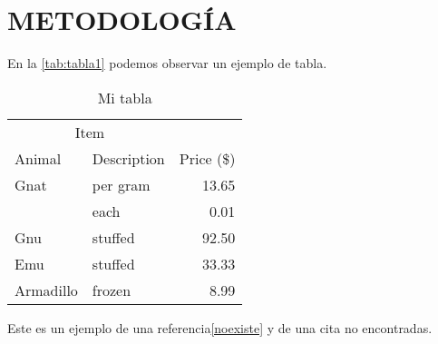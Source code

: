 \chapter{METODOLOGÍA}

\lipsum[1-1] \parencite{latex2e}

En la \autoref{tab:tabla1} podemos observar un ejemplo de tabla.

\begin{table}[H]
	\centering
	\caption{Mi tabla}\label{tab:tabla1}
	\begin{tabular}{@{}llr@{}}
		\toprule
		\multicolumn{2}{c}{Item} &                          \\ \cmidrule(r){1-2}
		Animal                   & Description & Price (\$) \\ \midrule
		Gnat                     & per gram    & 13.65      \\
		                         & each        & 0.01       \\
		Gnu                      & stuffed     & 92.50      \\
		Emu                      & stuffed     & 33.33      \\
		Armadillo                & frozen      & 8.99       \\ \bottomrule
	\end{tabular}
\end{table}

Este es un ejemplo de una referencia\autoref{noexiste} y de una cita\parencite{noexiste} no encontradas.